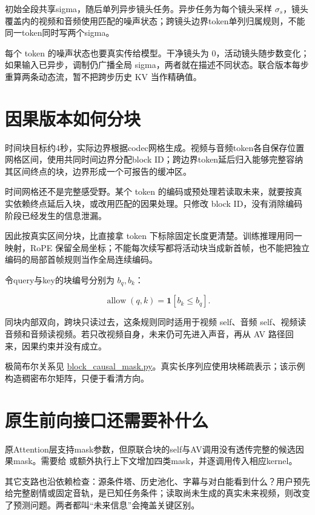 初始全段共享sigma，随后单列异步镜头任务。异步任务为每个镜头采样 \(\sigma_s\)，镜头覆盖内的视频和音频使用匹配的噪声状态；跨镜头边界token单列归属规则，不能同一token同时写两个sigma。

每个 token 的噪声状态也要真实传给模型。干净镜头为 0，活动镜头随步数变化；如果输入已异步，调制仍广播全局 sigma，两者就在描述不同状态。联合版本每步重算两条动态流，暂不把跨步历史 KV 当作精确值。

\section{因果版本如何分块}\label{seedance-m24-ux56e0ux679cux7248ux672cux5982ux4f55ux5206ux5757}

时间块目标约4秒，实际边界根据codec网格生成。视频与音频token各自保存位置网格区间，使用共同时间边界分配block ID；跨边界token延后归入能够完整容纳其区间终点的块，边界形成一个可报告的缓冲区。

时间网格还不是完整感受野。某个 token 的编码或预处理若读取未来，就要按真实依赖终点延后入块，或改用匹配的因果处理。只修改 block ID，没有消除编码阶段已经发生的信息泄漏。

因此按真实区间分块，比直接拿 token 下标除固定长度更清楚。训练推理用同一映射，RoPE 保留全局坐标；不能每次续写都将活动块当成新首帧，也不能把独立编码的局部首帧规则当作全局连续编码。

令query与key的块编号分别为 \(b_q,b_k\)：

\[
\operatorname{allow}(q,k)=\mathbf1[b_k\le b_q].
\]

同块内部双向，跨块只读过去，这条规则同时适用于视频 self、音频 self、视频读音频和音频读视频。若只改视频自身，未来仍可先进入声音，再从 AV 路径回来，因果约束并没有成立。

极简布尔关系见 \hyperref[code-block-causal-mask]{block\_causal\_mask.py}。真实长序列应使用块稀疏表示；该示例构造稠密布尔矩阵，只便于看清方向。

\section{原生前向接口还需要补什么}\label{seedance-m24-ux539fux751fux524dux5411ux63a5ux53e3ux8fd8ux9700ux8981ux8865ux4ec0ux4e48}

原Attention层支持mask参数，但原联合块的self与AV调用没有透传完整的候选因果mask。需要给  或额外执行上下文增加四类mask，并逐调用传入相应kernel。

其它支路也沿依赖检查：源条件塔、历史池化、字幕与对白能看到什么？用户预先给完整剧情或固定音轨，是已知任务条件；读取尚未生成的真实未来视频，则改变了预测问题。两者都叫“未来信息”会掩盖关键区别。

